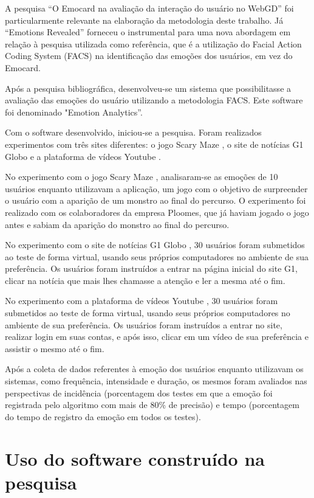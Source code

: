 A pesquisa “O Emocard na avaliação da interação do usuário no WebGD” \cite{5} foi particularmente relevante na elaboração da metodologia deste trabalho. Já “Emotions Revealed” \cite{3} forneceu o instrumental para uma nova abordagem em relação à pesquisa utilizada como referência, que é a utilização do Facial Action Coding System (FACS) \cite{5} na identificação das emoções dos usuários, em vez do Emocard.

Após a pesquisa bibliográfica, desenvolveu-se um sistema que possibilitasse a avaliação das emoções do usuário utilizando a metodologia FACS. Este software foi denominado "Emotion Analytics”.

Com o software desenvolvido, iniciou-se a pesquisa. Foram realizados experimentos com três sites diferentes: o jogo Scary Maze \cite{18}, o site de notícias G1 Globo \cite{19} e a plataforma de vídeos Youtube \cite{20}.

No experimento com o jogo Scary Maze \cite{18}, analisaram-se as emoções de 10 usuários enquanto utilizavam a aplicação, um jogo com o objetivo de surpreender o usuário com a aparição de um monstro ao final do percurso. O experimento foi realizado com os colaboradores da empresa Ploomes, que já haviam jogado o jogo antes e sabiam da aparição do monstro ao final do percurso.

No experimento com o site de notícias G1 Globo \cite{19}, 30 usuários foram submetidos ao teste de forma virtual, usando seus próprios computadores no ambiente de sua preferência. Os usuários foram instruídos a entrar na página inicial do site G1, clicar na notícia que mais lhes chamasse a atenção e ler a mesma até o fim.

No experimento com a plataforma de vídeos Youtube \cite{20}, 30 usuários foram submetidos ao teste de forma virtual, usando seus próprios computadores no ambiente de sua preferência. Os usuários foram instruídos a entrar no site, realizar login em suas contas, e após isso, clicar em um vídeo de sua preferência e assistir o mesmo até o fim.

Após a coleta de dados referentes à emoção dos usuários enquanto utilizavam os sistemas, como frequência, intensidade e duração, os mesmos foram avaliados nas perspectivas de incidência (porcentagem dos testes em que a emoção foi registrada pelo algoritmo com mais de 80\% de precisão) e tempo (porcentagem do tempo de registro da emoção em todos os testes).

\section{Uso do software construído na pesquisa}

